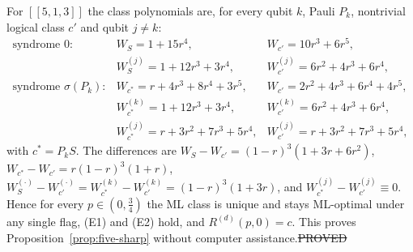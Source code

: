 \begin{proposition}\label{prop:five-hand}
For $[[5,1,3]]$ the class polynomials are, for every qubit $k$, Pauli $P_k$, nontrivial logical class $c'$ and qubit $j\ne k$:
\[
\begin{array}{lll}
\text{syndrome }0: & W_S=1+15r^4, & W_{c'}=10r^3+6r^5,\\
& W^{(j)}_S=1+12r^3+3r^4, & W^{(j)}_{c'}=6r^2+4r^3+6r^4,\\
\text{syndrome }\sigma(P_k): & W_{c^\ast}=r+4r^3+8r^4+3r^5, & W_{c'}=2r^2+4r^3+6r^4+4r^5,\\
& W^{(k)}_{c^\ast}=1+12r^3+3r^4, & W^{(k)}_{c'}=6r^2+4r^3+6r^4,\\
& W^{(j)}_{c^\ast}=r+3r^2+7r^3+5r^4, & W^{(j)}_{c'}=r+3r^2+7r^3+5r^4,
\end{array}
\]
with $c^\ast=P_kS$. The differences are $W_S-W_{c'}=(1-r)^3(1+3r+6r^2)$, $W_{c^\ast}-W_{c'}=r(1-r)^3(1+r)$, $W^{(\cdot)}_{S}-W^{(\cdot)}_{c'}=W^{(k)}_{c^\ast}-W^{(k)}_{c'}=(1-r)^3(1+3r)$, and $W^{(j)}_{c^\ast}-W^{(j)}_{c'}\equiv0$.
Hence for every $p\in(0,\tfrac34)$ the ML class is unique and stays ML-optimal under any single flag, (E1) and (E2) hold, and $R^{(d)}(p,0)=c$. This proves Proposition~\ref{prop:five-sharp} without computer assistance.\hfill\st{PROVED}
\end{proposition}
